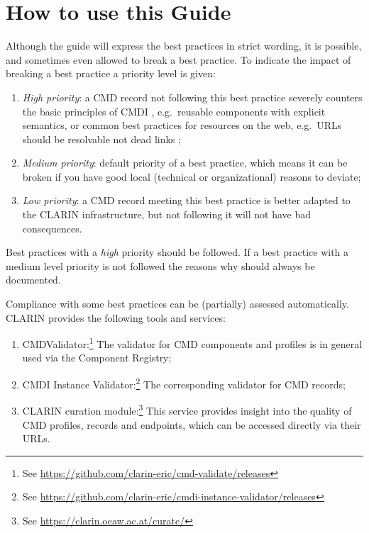 \section{How to use this Guide}

Although the guide will express the best practices in strict wording, it is possible, and sometimes even allowed to break a best practice. To indicate the impact of breaking a best practice a priority level is given:

\begin{enumerate}
\def\labelenumi{\arabic{enumi}.}
\tightlist
\item
  \emph{High priority}: a CMD record not following this best practice severely counters the basic principles of CMDI , e.g.~reusable components with explicit semantics, or common best practices for resources on the web, e.g.~URLs should be resolvable not dead links ;
\item
  \emph{Medium priority}: default priority of a best practice, which means it can be broken if you have good local (technical or organizational) reasons to deviate;
\item
  \emph{Low priority}: a CMD record meeting this best practice is better adapted to the CLARIN infrastructure, but not following it will not have bad consequences.
\end{enumerate}

Best practices with a \emph{high} priority should be followed. If a best practice with a medium level priority is not followed the reasons why should always be documented.

Compliance with some best practices can be (partially) assessed
automatically. CLARIN provides the following tools and services:

\begin{enumerate}
\def\labelenumi{\arabic{enumi}.}
\tightlist
\item
  CMDValidator:\footnote{See
    \url{https://github.com/clarin-eric/cmd-validate/releases}} The validator for CMD components and profiles is in general used via the Component Registry;
\item
  CMDI Instance Validator:\footnote{See
    \url{https://github.com/clarin-eric/cmdi-instance-validator/releases}}
  The corresponding validator for CMD records;
\item
  CLARIN curation module:\footnote{See
    \url{https://clarin.oeaw.ac.at/curate/}} This service provides insight into the quality of CMD profiles, records and endpoints, which can be accessed directly via their URLs.
\end{enumerate}

